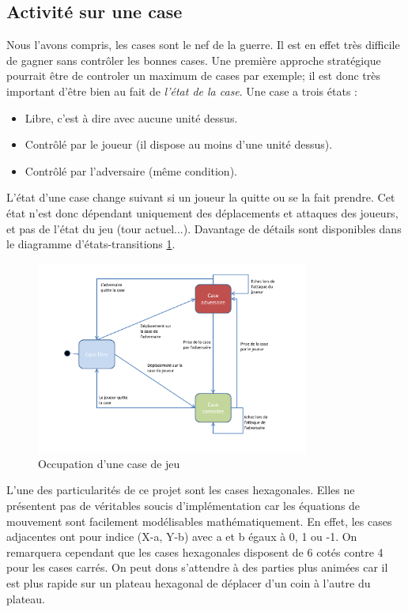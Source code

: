 \subsection{Activité sur une case}
Nous l'avons compris, les cases sont le nef de la guerre.
Il est en effet très difficile de gagner sans contrôler les bonnes cases.
Une première approche stratégique pourrait être de controler un maximum de cases par exemple; il est donc très important d'être bien au fait de \textit{l'état de la case}.
Une case a trois états :
\begin{itemize}
  \item Libre, c'est à dire avec aucune unité dessus.
  \item Contrôlé par le joueur (il dispose au moins d'une unité dessus).
  \item Contrôlé par l'adversaire (même condition).
\end{itemize}
L'état d'une case change suivant si un joueur la quitte ou se la fait prendre.
Cet état n'est donc dépendant uniquement des déplacements et attaques des joueurs, et pas de l'état du jeu (tour actuel...).
Davantage de détails sont disponibles dans le diagramme d'états-transitions \ref{fig:CaseOccupation}.
\begin{figure}[h!]
    \centering
    \includegraphics[width=0.8\textwidth]{res/OccupationCase.png}
    \caption{Occupation d'une case de jeu}
    \label{fig:CaseOccupation}
\end{figure}
L'une des particularités de ce projet sont les cases hexagonales.
Elles ne présentent pas de véritables soucis d'implémentation car les équations de mouvement sont facilement modélisables mathématiquement.
En effet, les cases adjacentes ont pour indice (X-a, Y-b) avec a et b égaux à 0, 1 ou -1.
On remarquera cependant que les cases hexagonales disposent de 6 cotés contre 4 pour les cases carrés.
On peut dons s'attendre à des parties plus animées car il est plus rapide sur un plateau hexagonal de déplacer d'un coin à l'autre du plateau.